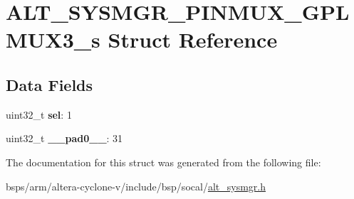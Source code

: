 \hypertarget{structALT__SYSMGR__PINMUX__GPLMUX3__s}{}\section{A\+L\+T\+\_\+\+S\+Y\+S\+M\+G\+R\+\_\+\+P\+I\+N\+M\+U\+X\+\_\+\+G\+P\+L\+M\+U\+X3\+\_\+s Struct Reference}
\label{structALT__SYSMGR__PINMUX__GPLMUX3__s}
\subsection*{Data Fields}
\begin{DoxyCompactItemize}
\item 
\mbox{\label{structALT__SYSMGR__PINMUX__GPLMUX3__s_ab3b2b313712fc0c912b5358a9cdcb811}} 
uint32\+\_\+t {\bfseries sel}\+: 1
\item 
\mbox{\label{structALT__SYSMGR__PINMUX__GPLMUX3__s_af1cf8b760ba1064ee7100193af65e6b6}} 
uint32\+\_\+t {\bfseries \+\_\+\+\_\+pad0\+\_\+\+\_\+}\+: 31
\end{DoxyCompactItemize}


The documentation for this struct was generated from the following file\+:\begin{DoxyCompactItemize}
\item 
bsps/arm/altera-\/cyclone-\/v/include/bsp/socal/\mbox{\hyperlink{alt__sysmgr_8h}{alt\+\_\+sysmgr.\+h}}\end{DoxyCompactItemize}
